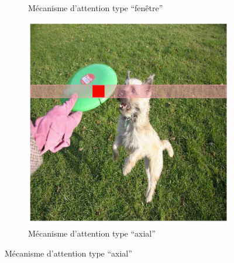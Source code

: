 \begin{figure}[H]
\begin{subfigure}[b]{0.30\textwidth}
        \caption{Mécanisme d'attention type ``fenêtre''}
        \label{fig:ch2_yolo_02_attention_area_window}
    \end{subfigure}
    \hfill
    \begin{subfigure}[b]{0.30\textwidth}
        \centering
        \includegraphics[width=\textwidth]{02-main/figures/ch2/ch2_yolo_03_attention_area_criss_axial.png}
        \caption{Mécanisme d'attention type ``axial''}
        \label{fig:ch2_yolo_03_attention_area_criss_axial}
    \end{subfigure}


\end{figure}
